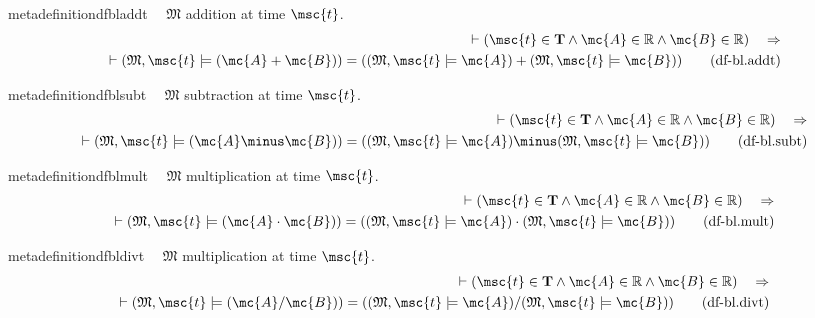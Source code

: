 \begin{restatable}{metadefinition}{dfbladdt}~~ $\mathfrak{M}$ addition at time
$\msc{t}$.
\begin{align}
\vdash ( \msc{t} \in \mathbf{T} \wedge \mc{A} \in \mathbb{R} \wedge \mc{B} \in
    \mathbb{R} )\quad\Rightarrow \notag \\ 
	\quad \vdash ( \mathfrak{M} , \msc{t} \models (
    \mc{A} + \mc{B} ) ) = ( ( \mathfrak{M} , \msc{t} \models \mc{A} ) + (
    \mathfrak{M} , \msc{t} \models \mc{B} )
    )\label{eq:df-bl.addt}\tag{df-bl.addt}
\end{align}
\end{restatable}

\begin{restatable}{metadefinition}{dfblsubt}~~ $\mathfrak{M}$ subtraction at time
$\msc{t}$.
\begin{align}
\vdash ( \msc{t} \in \mathbf{T} \wedge \mc{A} \in \mathbb{R} \wedge \mc{B} \in
    \mathbb{R} )\quad\Rightarrow \notag \\ 
	\quad \vdash ( \mathfrak{M} , \msc{t} \models (
    \mc{A} \minus \mc{B} ) ) = ( ( \mathfrak{M} , \msc{t} \models \mc{A} )
    \minus ( \mathfrak{M} , \msc{t} \models \mc{B} )
    )\label{eq:df-bl.subt}\tag{df-bl.subt}
\end{align}
\end{restatable}

\begin{restatable}{metadefinition}{dfblmult}~~ $\mathfrak{M}$ multiplication at time
$\msc{t}$.
\begin{align}
\vdash ( \msc{t} \in \mathbf{T} \wedge \mc{A} \in \mathbb{R} \wedge \mc{B} \in
    \mathbb{R} )\quad\Rightarrow \notag \\ 
	\quad \vdash ( \mathfrak{M} , \msc{t} \models (
    \mc{A} \cdot \mc{B} ) ) = ( ( \mathfrak{M} , \msc{t} \models \mc{A} ) \cdot
    ( \mathfrak{M} , \msc{t} \models \mc{B} )
    )\label{eq:df-bl.mult}\tag{df-bl.mult}
\end{align}
\end{restatable}

\begin{restatable}{metadefinition}{dfbldivt}~~ $\mathfrak{M}$ multiplication at time
$\msc{t}$.
\begin{align}
\vdash ( \msc{t} \in \mathbf{T} \wedge \mc{A} \in \mathbb{R} \wedge \mc{B} \in
    \mathbb{R} )\quad\Rightarrow \notag \\ 
	\quad \vdash ( \mathfrak{M} , \msc{t} \models (
    \mc{A} / \mc{B} ) ) = ( ( \mathfrak{M} , \msc{t} \models \mc{A} ) / (
    \mathfrak{M} , \msc{t} \models \mc{B} )
    )\label{eq:df-bl.divt}\tag{df-bl.divt}
\end{align}
\end{restatable}

